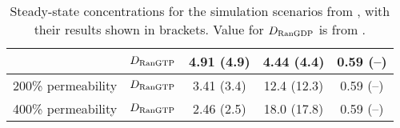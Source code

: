 \documentclass[12pt,notitlepage]{article}
\begin{document}
\begin{table}
\begin{tabular}{c|c|c|c|c}
	&
	$D_{\ce{RanGTP}}$
	&
	4.91
	(4.9)
	& 
	4.44
	(4.4)
	&
	0.59 (--)
	\\
	\hline
	200\% permeability
	&
	$D_{\ce{RanGTP}}$
	&
	3.41
	(3.4)
	& 
	12.4
	(12.3)
	&
	0.59 (--)
	\\
	\hline
	400\% permeability
	&
	$D_{\ce{RanGTP}}$
	&
	2.46
	(2.5)
	& 
	18.0
	(17.8)
	&
	0.59 (--)
	\\
	\hline
\end{tabular}
\caption{%
	Steady-state concentrations
	for the simulation scenarios
	from \cite[Table~II/III]{GoerlichSeewaldRibbeck2003},
	with
	their results shown in brackets.
	Value for $D_{\ce{RanGDP}}$ is
	from \cite[Fig.~3]{GoerlichSeewaldRibbeck2003}.
}
\label{t:GSR-condi}
\end{table}




\printbibliography %
\normalsize





\SHOWTODOS


\leavevmode\vfill{\tiny\color{lightgray}\hfill{\DTMnow}}
\end{document}
